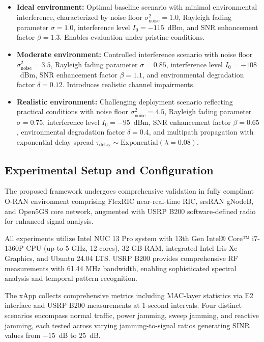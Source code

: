 \documentclass[journal]{IEEEtran}
\begin{document}
\begin{itemize}
    \item \textbf{Ideal environment:} Optimal baseline scenario with minimal environmental interference, characterized by noise floor $\sigma^2_{\text{noise}} = 1.0$, Rayleigh fading parameter $\sigma = 1.0$, interference level $I_0 = -115$~dBm, and SNR enhancement factor $\beta = 1.3$. Enables evaluation under pristine conditions.
    
    \item \textbf{Moderate environment:} Controlled interference scenario with noise floor $\sigma^2_{\text{noise}} = 3.5$, Rayleigh fading parameter $\sigma = 0.85$, interference level $I_0 = -108$~dBm, SNR enhancement factor $\beta = 1.1$, and environmental degradation factor $\delta = 0.12$. Introduces realistic channel impairments.
    
    \item \textbf{Realistic environment:} Challenging deployment scenario reflecting practical conditions with noise floor $\sigma^2_{\text{noise}} = 4.5$, Rayleigh fading parameter $\sigma = 0.75$, interference level $I_0 = -95$~dBm, SNR enhancement factor $\beta = 0.65$, environmental degradation factor $\delta = 0.4$, and multipath propagation with exponential delay spread $\tau_{\text{delay}} \sim \text{Exponential}(\lambda = 0.08)$.
\end{itemize}

\subsection{Experimental Setup and Configuration}

The proposed framework undergoes comprehensive validation in fully compliant O-RAN environment comprising FlexRIC near-real-time RIC, srsRAN gNodeB, and Open5GS core network, augmented with USRP B200 software-defined radio for enhanced signal analysis.

All experiments utilize Intel NUC 13 Pro system with 13th Gen Intel® Core™ i7-1360P CPU (up to 5 GHz, 12 cores), 32 GB RAM, integrated Intel Iris Xe Graphics, and Ubuntu 24.04 LTS. USRP B200 provides comprehensive RF measurements with 61.44 MHz bandwidth, enabling sophisticated spectral analysis and temporal pattern recognition.

The xApp collects comprehensive metrics including MAC-layer statistics via E2 interface and USRP B200 measurements at 1-second intervals. Four distinct scenarios encompass normal traffic, power jamming, sweep jamming, and reactive jamming, each tested across varying jamming-to-signal ratios generating SINR values from $-15$~dB to $25$~dB.
\end{document}
